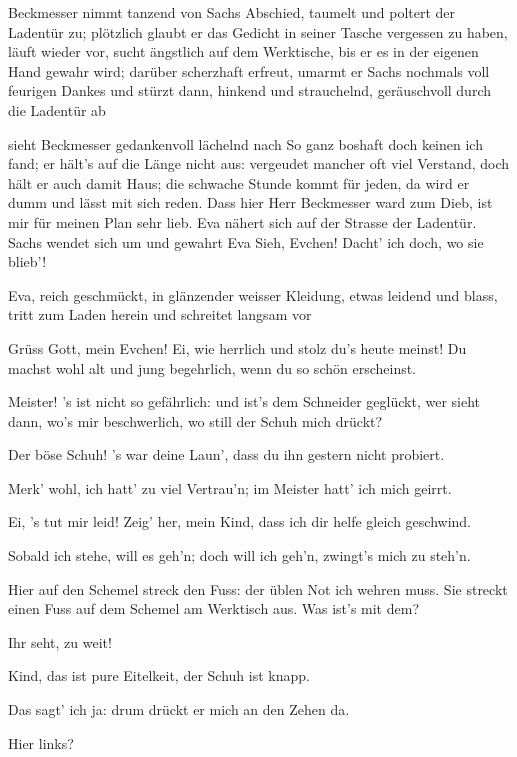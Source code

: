 \begin{drama}
Beckmesser nimmt tanzend von Sachs Abschied, taumelt und poltert der Ladentür zu; plötzlich glaubt er das Gedicht in seiner Tasche vergessen zu haben, läuft wieder vor, sucht ängstlich auf dem Werktische, bis er es in der eigenen Hand gewahr wird; darüber scherzhaft erfreut, umarmt er Sachs nochmals voll feurigen Dankes und stürzt dann, hinkend und strauchelnd, geräuschvoll durch die Ladentür ab

\Sachsspeaks
sieht Beckmesser gedankenvoll lächelnd nach
So ganz boshaft doch keinen ich fand;
er hält's auf die Länge nicht aus:
vergeudet mancher oft viel Verstand,
doch hält er auch damit Haus;
die schwache Stunde kommt für jeden,
da wird er dumm und lässt mit sich reden.
Dass hier Herr Beckmesser ward zum Dieb,
ist mir für meinen Plan sehr lieb.
Eva nähert sich auf der Strasse der Ladentür. Sachs wendet sich um und gewahrt Eva
Sieh, Evchen! Dacht' ich doch, wo sie blieb'!


\scene

Eva, reich geschmückt, in glänzender weisser Kleidung, etwas leidend und blass, tritt zum Laden herein und schreitet langsam vor

\Sachsspeaks
Grüss Gott, mein Evchen! Ei, wie herrlich
und stolz du's heute meinst!
Du machst wohl alt und jung begehrlich,
wenn du so schön erscheinst.

\Evaspeaks
Meister! 's ist nicht so gefährlich:
und ist's dem Schneider geglückt,
wer sieht dann, wo's mir beschwerlich,
wo still der Schuh mich drückt?

\Sachsspeaks
Der böse Schuh! 's war deine Laun',
dass du ihn gestern nicht probiert.

\Evaspeaks
Merk' wohl, ich hatt' zu viel Vertrau'n;
im Meister hatt' ich mich geirrt.

\Sachsspeaks
Ei, 's tut mir leid! Zeig' her, mein Kind,
dass ich dir helfe gleich geschwind.

\Evaspeaks
Sobald ich stehe, will es geh'n;
doch will ich geh'n, zwingt's mich zu steh'n.

\Sachsspeaks
Hier auf den Schemel streck den Fuss:
der üblen Not ich wehren muss.
Sie streckt einen Fuss auf dem Schemel am Werktisch aus.
Was ist's mit dem?

\Evaspeaks
Ihr seht, zu weit!

\Sachsspeaks
Kind, das ist pure Eitelkeit,
der Schuh ist knapp.

\Evaspeaks
Das sagt' ich ja:
drum drückt er mich an den Zehen da.

\Sachsspeaks
Hier links?


\end{drama}
